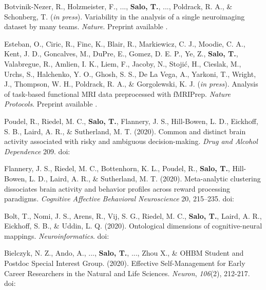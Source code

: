 \documentclass[10pt]{article}
\newcommand{\textlink}[3][blue]{\href{#2}{\color{#1}{#3}}}
\begin{document}
\begin{hangparas}{.25in}{1}

	Botvinik-Nezer, R., Holzmeister, F., ..., \textbf{Salo, T.}, ...,
	Poldrack, R. A., \& Schonberg, T. (\emph{in press}).
	Variability in the analysis of a single neuroimaging dataset by many teams.
	\emph{Nature}. Preprint available \textlink{https://doi.org/10.1101/843193}{here}.

	\bigskip

	Esteban, O., Ciric, R., Finc, K., Blair, R., Markiewicz, C. J.,
	Moodie, C. A., Kent, J. D., Goncalves, M., DuPre, E., Gomez, D. E. P.,
	Ye, Z., \textbf{Salo, T.}, Valabregue, R., Amlien, I. K., Liem, F.,
	Jacoby, N., Stojić, H., Cieslak, M., Urchs, S., Halchenko, Y. O.,
	Ghosh, S. S., De La Vega, A., Yarkoni, T., Wright, J., Thompson, W. H.,
	Poldrack, R. A., \& Gorgolewski, K. J. (\emph{in press}).
	Analysis of task-based functional MRI data preprocessed with fMRIPrep.
	\emph{Nature Protocols}.
 	Preprint available \textlink{https://doi.org/10.1101/694364}{here}.

	\bigskip

	Poudel, R., Riedel, M. C., \textbf{Salo, T.}, Flannery, J. S., Hill-Bowen, L. D.,
	Eickhoff, S. B., Laird, A. R., \& Sutherland, M. T. (2020).
	Common and distinct brain activity associated with risky and ambiguous decision-making.
	\emph{Drug and Alcohol Dependence} 209.
	doi:\textlink{https://doi.org/10.1016/j.drugalcdep.2020.107884}{10.1016/j.drugalcdep.2020.107884}

	\bigskip

	Flannery, J. S., Riedel, M. C., Bottenhorn, K. L., Poudel, R.,
	\textbf{Salo, T.}, Hill-Bowen, L. D., Laird, A. R., \& Sutherland, M. T. (2020).
	Meta-analytic clustering dissociates brain activity and behavior profiles across reward processing paradigms.
	\emph{Cognitive Affective Behavioral Neuroscience} 20, 215–235.
	doi:\textlink{https://doi.org/10.3758/s13415-019-00763-7}{10.3758/s13415-019-00763-7}

	\bigskip

	Bolt, T., Nomi, J. S., Arens, R., Vij, S. G., Riedel, M. C.,
	\textbf{Salo, T.}, Laird, A. R., Eickhoff, S. B., \& Uddin, L. Q. (2020).
	Ontological dimensions of cognitive-neural mappings. \emph{Neuroinformatics}.
	doi:\textlink{https://doi.org/10.1007/s12021-020-09454-y}{10.1007/s12021-020-09454-y}

	\bigskip

	Bielczyk, N. Z., Ando, A., ..., \textbf{Salo, T.}, ..., Zhou X., \&
	OHBM Student and Postdoc Special Interest Group. (2020).
	Effective Self-Management for Early Career Researchers in the Natural and Life Sciences.
	\emph{Neuron}, \emph{106}(2), 212-217.
	doi:\textlink{https://doi.org/10.1016/j.neuron.2020.03.015}{10.1016/j.neuron.2020.03.015}


\end{hangparas}
\end{document}
